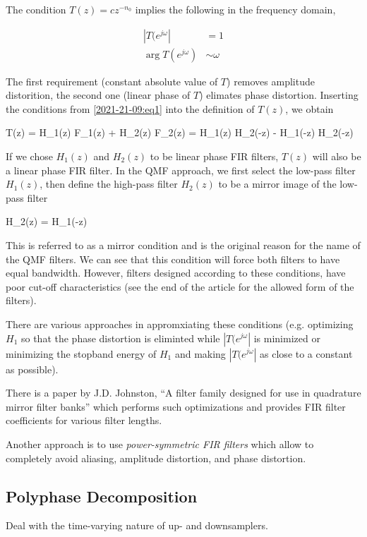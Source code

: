 The condition $T(z) = c z^{-n_0}$ implies the following in the frequency domain,

\begin{align*}
  |T(e^{j \omega}| &= 1 \\
  \arg T(e^{j \omega}) &\sim \omega 
\end{align*}

The first requirement (constant absolute value of $T$) removes amplitude distorition, the second one (linear phase of $T$) elimates phase distortion. Inserting the conditions from \eqref{2021-21-09:eq1} into the definition of $T(z)$, we obtain

\be\label{2021-21-09:eq2}
T(z) = H_1(z) F_1(z) + H_2(z) F_2(z) = H_1(z) H_2(-z) - H_1(-z) H_2(-z)
\ee

If we chose $H_1(z)$ and $H_2(z)$ to be linear phase FIR filters, $T(z)$ will also be a linear phase FIR filter. In the QMF approach, we first select the low-pass filter $H_1(z)$, then define the high-pass filter $H_2(z)$ to be a mirror image of the low-pass filter

\bee
H_2(z) = H_1(-z)
\eee

This is referred to as a mirror condition and is the original reason for the name of the QMF filters. We can see that this condition will force both filters to have equal bandwidth. However, filters designed according to these conditions, have poor cut-off characteristics (see the end of the article for the allowed form of the filters).

There are various approaches in appromxiating these conditions (e.g. optimizing $H_1$ so that the phase distortion is eliminted while $|T(e^{j \omega}|$ is minimized or minimizing the stopband energy of $H_1$ and making $|T(e^{j \omega}|$ as close to a constant as possible).

There is a paper by J.D. Johnston, ``A filter family designed for use in quadrature mirror filter banks'' which performs such optimizations and provides FIR filter coefficients for various filter lengths.

Another approach is to use \emph{power-symmetric FIR filters} which allow to completely avoid aliasing, amplitude distortion, and phase distortion.

\subsection{Polyphase Decomposition}

Deal with the time-varying nature of up- and downsamplers.

